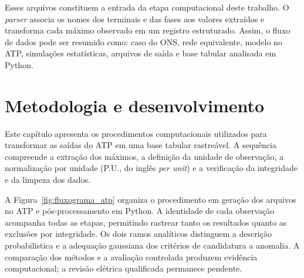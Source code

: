 \documentclass[
	12pt,				%
	openright,			%
	oneside,			%
	a4paper,			%
	chapter=TITLE,		%
	section=TITLE,		%
	subsection=TITLE,	%
	subsubsection=TITLE,%
	english,			%
	brazilian			%
	]{abntex2}
\theoremstyle{definition}
\begin{document}
Esses arquivos constituem a entrada da etapa computacional deste trabalho. O
\textit{parser} associa os nomes dos terminais e das fases aos valores extraídos
e transforma cada máximo observado em um registro estruturado. Assim, o fluxo
de dados pode ser resumido como: caso do ONS, rede equivalente, modelo no ATP,
simulações estatísticas, arquivos de saída e base tabular analisada em Python.

\chapter{Metodologia e desenvolvimento}
\label{chap:methodology}

Este capítulo apresenta os procedimentos computacionais utilizados para
transformar as saídas do ATP em uma base tabular rastreável. A sequência
compreende a extração dos máximos, a definição da unidade de observação, a
normalização por unidade (P.U., do inglês \textit{per unit}) e a verificação da integridade e da limpeza dos dados.

A Figura~\ref{fig:fluxograma_atp} organiza o procedimento em geração dos
arquivos no ATP e pós-processamento em Python. A identidade de cada observação
acompanha todas as etapas, permitindo rastrear tanto os resultados quanto as
exclusões por integridade. Os dois ramos analíticos distinguem a descrição
probabilística e a adequação gaussiana dos critérios de candidatura a anomalia.
A comparação dos métodos e a avaliação controlada produzem evidência
computacional; a revisão elétrica qualificada permanece pendente.
\end{document}
